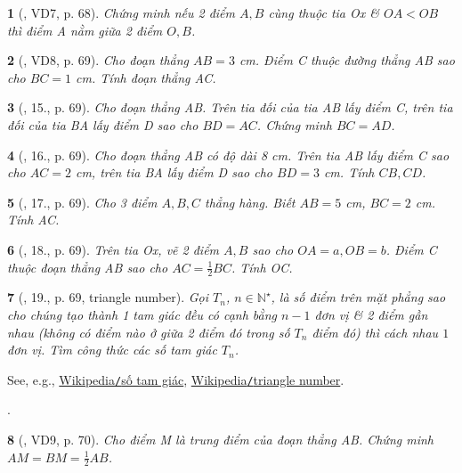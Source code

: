 \documentclass{article}
\newtheorem{baitoan}{}
\begin{document}
\begin{baitoan}[\cite{Binh_Toan_6_tap_2}, VD7, p. 68]
	Chứng minh nếu 2 điểm $A,B$ cùng thuộc tia Ox \& $OA < OB$ thì điểm A nằm giữa 2 điểm $O,B$.
\end{baitoan}

\begin{baitoan}[\cite{Binh_Toan_6_tap_2}, VD8, p. 69]
	Cho đoạn thẳng $AB = 3$ {\rm cm}. Điểm C thuộc đường thẳng AB sao cho $BC = 1$ {\rm cm}. Tính  đoạn thẳng AC.
\end{baitoan}

\begin{baitoan}[\cite{Binh_Toan_6_tap_2}, 15., p. 69]
	Cho đoạn thẳng AB. Trên tia đối của tia AB lấy điểm C, trên tia đối của tia BA lấy điểm D sao cho $BD = AC$. Chứng minh $BC = AD$.
\end{baitoan}

\begin{baitoan}[\cite{Binh_Toan_6_tap_2}, 16., p. 69]
	Cho đoạn thẳng AB có độ dài {\rm8 cm}. Trên tia AB lấy điểm C sao cho $AC = 2$ {\rm cm}, trên tia BA lấy điểm D sao cho $BD = 3$ {\rm cm}. Tính  $CB,CD$.
\end{baitoan}

\begin{baitoan}[\cite{Binh_Toan_6_tap_2}, 17., p. 69]
	Cho 3 điểm $A,B,C$ thẳng hàng. Biết $AB = 5$ {\rm cm}, $BC = 2$ {\rm cm}. Tính  AC.
\end{baitoan}

\begin{baitoan}[\cite{Binh_Toan_6_tap_2}, 18., p. 69]
	Trên tia Ox, vẽ 2 điểm $A,B$ sao cho $OA = a,OB = b$. Điểm C thuộc đoạn thẳng AB sao cho $AC = \frac{1}{2}BC$. Tính  OC.
\end{baitoan}

\begin{baitoan}[\cite{Binh_Toan_6_tap_2}, 19., p. 69, triangle number]
	Gọi $T_n$, $n\in\mathbb{N}^\star$, là số điểm trên mặt phẳng sao cho chúng tạo thành 1 tam giác đều có cạnh bằng $n - 1$ đơn vị \& 2 điểm gần nhau (không có điểm nào ở giữa 2 điểm đó trong số $T_n$ điểm đó) thì cách nhau $1$ đơn vị. Tìm công thức các số tam giác $T_n$.
\end{baitoan}
See, e.g., \href{https://vi.wikipedia.org/wiki/S%E1%BB%91_tam_gi%C3%A1c}{Wikipedia{\tt/}số tam giác}, \href{https://en.wikipedia.org/wiki/Triangular_number}{Wikipedia{\tt/}triangle number}.

\noindent\cite[20., p. 70]{Binh_Toan_6_tap_2}.

\begin{baitoan}[\cite{Binh_Toan_6_tap_2}, VD9, p. 70]
	Cho điểm M là trung điểm của đoạn thẳng AB. Chứng minh $AM = BM = \frac{1}{2}AB$.
\end{baitoan}
\end{document}
